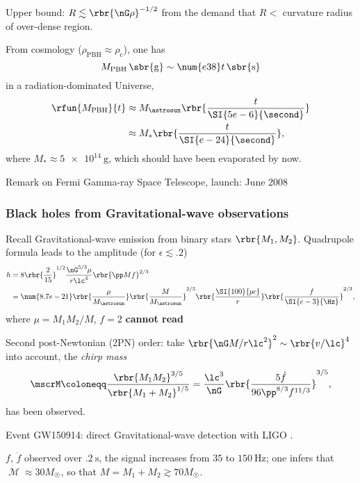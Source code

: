 Upper bound: $R \lesssim \rbr{\nG \rho}^{-1/2}$ from the demand that $R < $ 
curvature radius of over-dense region.

From cosmology ($\rho_\text{PBH} \approx \rho_\text{c}$), one has
\begin{equation}
M_\text{PBH}\,\sbr{\mathrm{g}} \sim \num{e38}t\,\sbr{\mathrm{s}}
\end{equation}
in a radiation-dominated Universe,
\begin{align}
\rfun{M_\text{PBH}}{t}
&\approx M_\astrosun \rbr{\frac{t}{\SI{5e-6}{\second}}} \nonumber \\
&\approx M_* \rbr{\frac{t}{\SI{e-24}{\second}}},
\end{align}
where $M_* \approx \SI{5e14}{\gram}$, which should have been evaporated by now.

Remark on Fermi Gamma-ray Space Telescope, launch: June 2008

\subsubsection{Black holes from Gravitational-wave observations}
Recall Gravitational-wave emission from binary stars $\rbr{M_1, M_2}$. 
Quadrupole formula leads to the amplitude (for $\epsilon \lesssim \num{.2}$)
\begin{align}
h &= 8\rbr{\frac{2}{15}}^{1/2} \frac{\nG^{5/3}\mu}{r\lc^4} \rbr{\pp M f}^{2/3}
\nonumber \\
&= \num{8.7e-21} \rbr{\frac{\mu}{M_\astrosun}} \rbr{\frac{M}{M_\astrosun}}^{2/3}
\rbr{\frac{\SI{100}{pc}}{r}} \rbr{\frac{f}{\SI{e-3}{\Hz}}}^{2/3},
\end{align}
where $\mu = M_1 M_2/M$, $f = 2$ \textbf{cannot read}

Second post-Newtonian (2PN) order: take $\rbr{\nG M/r\lc^2}^2 \sim 
\rbr{v/\lc}^4$
into account, the \emph{chirp mass}
\begin{equation}
\mscrM\coloneqq\frac{\rbr{M_1 M_2}^{3/5}}{\rbr{M_1 + M_2}^{1/5}}
= \frac{\lc^3}{\nG}\rbr{\frac{5\dot{f}}{96\pp^{8/3}f^{11/3}}}^{3/5},
\end{equation}
has been observed.

Event GW150914: direct Gravitational-wave detection with LIGO 
\cite{PhysRevLett.116.061102}.

$f$, $\dot{f}$ observed over $\SI{.2}{\second}$, the signal increases from 
$\num{35}$ to $\SI{150}{\Hz}$; one infers that $\mscrM \approx 30 M_\astrosun$, 
so that $M = M_1 + M_2 \gtrsim 70 M_\astrosun$.

